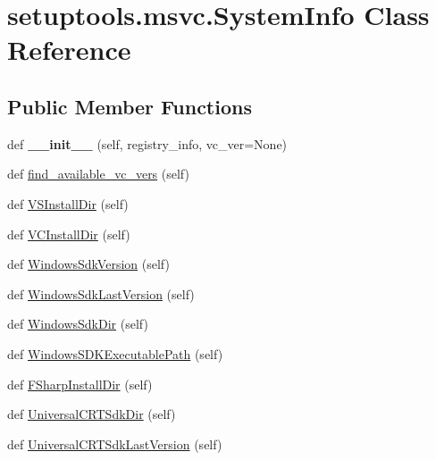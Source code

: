 \hypertarget{classsetuptools_1_1msvc_1_1_system_info}{}\section{setuptools.\+msvc.\+System\+Info Class Reference}
\label{classsetuptools_1_1msvc_1_1_system_info}
\subsection*{Public Member Functions}
\begin{DoxyCompactItemize}
\item 
\mbox{\label{classsetuptools_1_1msvc_1_1_system_info_a8811d62e19a741da177fc8c4cfe180bc}} 
def {\bfseries \+\_\+\+\_\+init\+\_\+\+\_\+} (self, registry\+\_\+info, vc\+\_\+ver=None)
\item 
def \hyperlink{classsetuptools_1_1msvc_1_1_system_info_a6ca135d6a2764687c0fae38efbe7651d}{find\+\_\+available\+\_\+vc\+\_\+vers} (self)
\item 
def \hyperlink{classsetuptools_1_1msvc_1_1_system_info_aa117395fa193bff19dde5fbb4cf6e3a3}{V\+S\+Install\+Dir} (self)
\item 
def \hyperlink{classsetuptools_1_1msvc_1_1_system_info_a64320eef8ba2ab8929cb03aa8308fc2d}{V\+C\+Install\+Dir} (self)
\item 
def \hyperlink{classsetuptools_1_1msvc_1_1_system_info_ae7566034b3ec2e80c3bf9d6d9289dc1b}{Windows\+Sdk\+Version} (self)
\item 
def \hyperlink{classsetuptools_1_1msvc_1_1_system_info_a379cb993ab7a7634c5806a4646a3cb15}{Windows\+Sdk\+Last\+Version} (self)
\item 
def \hyperlink{classsetuptools_1_1msvc_1_1_system_info_a2aaf265345e0e8438533c8a325b57e7f}{Windows\+Sdk\+Dir} (self)
\item 
def \hyperlink{classsetuptools_1_1msvc_1_1_system_info_a7a8b2e20afb2590c88e26c002bd8a365}{Windows\+S\+D\+K\+Executable\+Path} (self)
\item 
def \hyperlink{classsetuptools_1_1msvc_1_1_system_info_a9a5c0f4de906f3fcb09d6e2ca3f37d43}{F\+Sharp\+Install\+Dir} (self)
\item 
def \hyperlink{classsetuptools_1_1msvc_1_1_system_info_afb81ca0402cf16fb2ee7d2a8867ee604}{Universal\+C\+R\+T\+Sdk\+Dir} (self)
\item 
def \hyperlink{classsetuptools_1_1msvc_1_1_system_info_adab24080174bef52de07fe5cb136a7e2}{Universal\+C\+R\+T\+Sdk\+Last\+Version} (self)

\end{DoxyCompactItemize}

